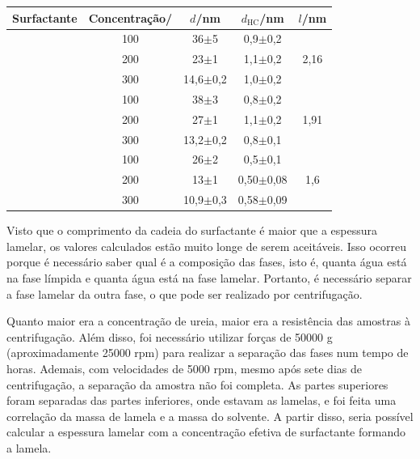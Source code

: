 		\begin{table}[H]
		{%
		\begin{tabular}{c c c c c}
			\toprule
			   Surfactante  & Concentração/\mM     & $d$/nm       & \(d_\mathrm{HC}\)/nm & \(l\)/nm               \\ \midrule
			\multirow{3}{*}{\CTAB} & 100              & 36$\pm$5     & 0,9$\pm$0,2          & \multirow{3}{*}{2,16}  \\
			                      & 200              & 23$\pm$1     & 1,1$\pm$0,2          &                        \\
			                      & 300              & 14,6$\pm$0,2 & 1,0$\pm$0,2          &                        \\ \midrule
			\multirow{3}{*}{\TTAB} & 100              & 38$\pm$3     & 0,8$\pm$0,2          & \multirow{3}{*}{1,91}  \\
			                      & 200              & 27$\pm$1     & 1,1$\pm$0,2          &                        \\
			                      & 300              & 13,2$\pm$0,2 & 0,8$\pm$0,1          &                        \\ \midrule
			\multirow{3}{*}{\DTAB} & 100              & 26$\pm$2     & 0,5$\pm$0,1          & \multirow{3}{*}{1,6}   \\
			                      & 200              & 13$\pm$1     & 0,50$\pm$0,08        &                        \\
			                      & 300              & 10,9$\pm$0,3 & 0,58$\pm$0,09        &                        \\ \bottomrule
		\end{tabular}
	}{}
	\end{table} 
	
	Visto que o comprimento da cadeia do surfactante é maior que a espessura lamelar, os valores calculados estão muito longe de serem aceitáveis. Isso ocorreu porque é necessário saber qual é a composição das fases, isto é, quanta água está na fase límpida e quanta água está na fase lamelar. Portanto, é necessário separar a fase lamelar da outra fase, o que pode ser realizado por centrifugação.

	Quanto maior era a concentração de ureia, maior era a resistência das amostras à centrifugação. Além disso, foi necessário utilizar forças de 50000 g (aproximadamente 25000 rpm) para realizar a separação das fases num tempo de horas. Ademais, com velocidades de 5000 rpm, mesmo após sete dias de centrifugação, a separação da amostra não foi completa. As partes superiores foram separadas das partes inferiores, onde estavam as lamelas, e foi feita uma correlação da massa de lamela e a massa do solvente. A partir disso, seria possível calcular a espessura lamelar com a concentração efetiva de surfactante formando a lamela.
	
